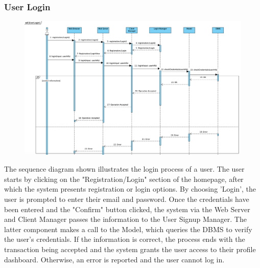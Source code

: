 \subsubsection{User Login}
\begin{figure}[H]
    \centering
    \includegraphics[width=1\textwidth]{SequenceDiagram/UserLogin.png}
    \label{fig:enter-label}
\end{figure}
The sequence diagram shown illustrates the login process of a user. The user starts by clicking on the "Registration/Login" section of the homepage, after which the system presents registration or login options. By choosing 'Login', the user is prompted to enter their email and password. Once the credentials have been entered and the "Confirm" button clicked, the system via the Web Server and Client Manager passes the information to the User Signup Manager. The latter component makes a call to the Model, which queries the DBMS to verify the user's credentials.
If the information is correct, the process ends with the transaction being accepted and the system grants the user access to their profile dashboard. Otherwise, an error is reported and the user cannot log in. 
